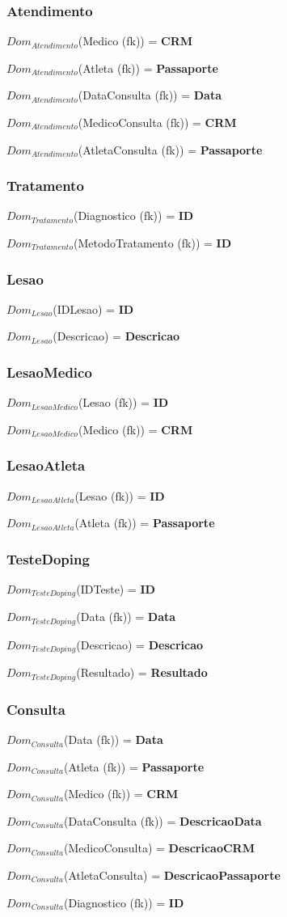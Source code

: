 \documentclass[12pt,a4paper]{article}
\newcommand{\createdomain}[3]{
    $Dom_{#1}$(#2) = {\bf #3}

}
\begin{document}
    \subsubsection{Atendimento}
        \createdomain{Atendimento}{Medico (fk)}{\bf CRM}
        \createdomain{Atendimento}{Atleta (fk)}{\bf Passaporte}
        \createdomain{Atendimento}{DataConsulta (fk)}{\bf Data}
        \createdomain{Atendimento}{MedicoConsulta (fk)}{\bf CRM}
        \createdomain{Atendimento}{AtletaConsulta (fk)}{\bf Passaporte}

    \subsubsection{Tratamento}
        \createdomain{Tratamento}{Diagnostico (fk)}{\bf ID}
        \createdomain{Tratamento}{MetodoTratamento (fk)}{\bf ID}

    \subsubsection{Lesao}
        \createdomain{Lesao}{IDLesao}{\bf ID}
        \createdomain{Lesao}{Descricao}{\bf Descricao}

    \subsubsection{LesaoMedico}
        \createdomain{LesaoMedico}{Lesao (fk)}{\bf ID}
        \createdomain{LesaoMedico}{Medico (fk)}{\bf CRM}

    \subsubsection{LesaoAtleta}
        \createdomain{LesaoAtleta}{Lesao (fk)}{\bf ID}
        \createdomain{LesaoAtleta}{Atleta (fk)}{\bf Passaporte}

    \subsubsection{TesteDoping}
        \createdomain{TesteDoping}{IDTeste}{\bf ID}
        \createdomain{TesteDoping}{Data (fk)}{\bf Data}
        \createdomain{TesteDoping}{Descricao}{\bf Descricao}
        \createdomain{TesteDoping}{Resultado}{\bf Resultado}

    \subsubsection{Consulta}
        \createdomain{Consulta}{Data (fk)}{\bf Data}
        \createdomain{Consulta}{Atleta (fk)}{\bf Passaporte}
        \createdomain{Consulta}{Medico (fk)}{\bf CRM}
        \createdomain{Consulta}{DataConsulta (fk)}{\bf DescricaoData}
        \createdomain{Consulta}{MedicoConsulta}{\bf DescricaoCRM}
        \createdomain{Consulta}{AtletaConsulta}{\bf DescricaoPassaporte}
        \createdomain{Consulta}{Diagnostico (fk)}{\bf ID}
\end{document}
